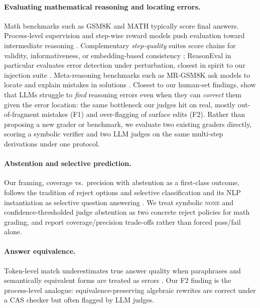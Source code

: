 \paragraph{Evaluating mathematical reasoning and locating errors.}
Math benchmarks such as GSM8K \citep{cobbe2021gsm8k} and MATH
\citep{hendrycks2021math} typically score final answers. Process-level
supervision and step-wise reward models push evaluation toward intermediate
reasoning \citep{uesato2022process,lightman2024verify,wang2024mathshepherd}.
Complementary \emph{step-quality} suites score chains for validity,
informativeness, or embedding-based consistency
\citep{golovneva2023roscoe,prasad2023receval,xia2025reasoneval}; ReasonEval in
particular evaluates error detection under perturbation, closest in spirit to
our injection suite \citep{xia2025reasoneval}. Meta-reasoning benchmarks such as
{MR-GSM8K} ask models to locate and explain mistakes in solutions
\citep{zeng2025mrgsm8k}. Closest to our human-set findings, \citet{tyen2024errors}
show that LLMs struggle to \emph{find} reasoning
errors even when they can \emph{correct} them given the error location: the
same bottleneck our judges hit on real, mostly out-of-fragment mistakes (F1) and
over-flagging of surface edits (F2). Rather than proposing a new grader or
benchmark, we evaluate two existing graders directly, scoring a symbolic
verifier and two LLM judges on the same multi-step derivations under one
protocol.

\paragraph{Abstention and selective prediction.}
Our framing, coverage vs.\ precision with abstention as a first-class
outcome, follows the tradition of reject options and selective
classification \citep{chow1970reject,elyaniv2010selective,geifman2017selective}
and its NLP instantiation as selective question answering
\citep{kamath2020selective}. We treat symbolic \textsc{none} and
confidence-thresholded judge abstention as two concrete reject policies for
math grading, and report coverage/precision trade-offs rather than forced
pass/fail alone.

\paragraph{Answer equivalence.}
Token-level match underestimates true answer quality when paraphrases and
semantically equivalent forms are treated as errors
\citep{bulian2022tomayto}. Our F2 finding is the process-level analogue:
equivalence-preserving algebraic rewrites are correct under a CAS checker but
often flagged by LLM judges.
